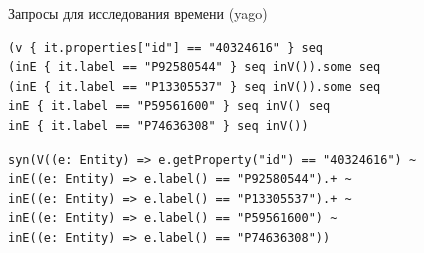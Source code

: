 \documentclass[aspectratio=169]{beamer}
\begin{document}
\begin{frame}[fragile]{Запросы для исследования времени (yago)}


  \begin{verbatim}
(v { it.properties["id"] == "40324616" } seq
(inE { it.label == "P92580544" } seq inV()).some seq
(inE { it.label == "P13305537" } seq inV()).some seq
inE { it.label == "P59561600" } seq inV() seq
inE { it.label == "P74636308" } seq inV())
\end{verbatim}

  \begin{verbatim}
syn(V((e: Entity) => e.getProperty("id") == "40324616") ~
inE((e: Entity) => e.label() == "P92580544").+ ~
inE((e: Entity) => e.label() == "P13305537").+ ~
inE((e: Entity) => e.label() == "P59561600") ~
inE((e: Entity) => e.label() == "P74636308"))
  \end{verbatim}

\end{frame}
\end{document}
